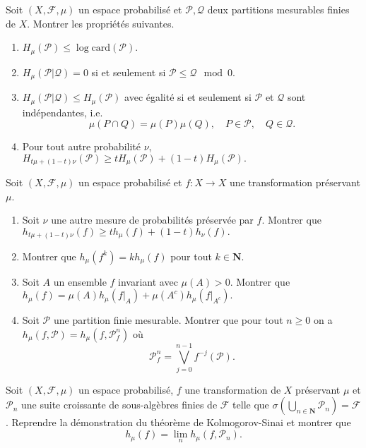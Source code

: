 \documentclass[a4paper,10pt,openany]{article}
\theoremstyle{plain}
\theoremstyle{definition}
\newcommand{\N}{\mathbf{N}}
\newcommand{\Pcal}{\mathcal{P}}
\begin{document}
\noindent Soit $(X,\mathcal{F},\mu)$ un espace probabilis\'e et $\mathcal{P}, \mathcal{Q}$ deux partitions mesurables finies de $X$. Montrer les propri\'et\'es suivantes.
\begin{enumerate}
\item $H_\mu(\mathcal{P}) \leq \log \mathrm{card} (\mathcal{P})$.
\item $H_\mu(\mathcal{P}| \mathcal{Q}) = 0$ si et seulement si $\mathcal{P}\leq \mathcal{Q} \mod 0$.
\item $H_\mu(\mathcal{P}| \mathcal{Q}) \leq H_\mu(\mathcal{P})$ avec \'egalit\'e si et seulement si $\mathcal{P}$ et $\mathcal{Q}$ sont ind\'ependantes, i.e.
$$
\mu(P\cap Q) = \mu(P)\mu(Q), \quad P \in \mathcal{P}, \quad Q \in \mathcal{Q}.
$$
\item Pour tout autre probabilit\'e $\nu$, $H_{t\mu+(1-t)\nu}(\mathcal{P}) \geq t H_\mu(\mathcal{P}) + (1-t)H_\mu(\mathcal{P}).$
\end{enumerate}
\vspace{0.6cm}

 \vspace{1.5mm} 

\noindent Soit $(X,\mathcal{F},\mu)$ un espace probabilis\'e et $f: X \to X$ une transformation pr\'eservant $\mu$.
\begin{enumerate}
\item Soit $\nu$ une autre mesure de probabilit\'es pr\'eserv\'ee par $f$. Montrer que
$
h_{t\mu + (1-t)\nu}(f) \geq th_{\mu}(f) + (1-t)h_\nu(f). 
$
\item Montrer que $h_\mu(f^k) = kh_\mu(f)$ pour tout $k \in \N$.
\item Soit $A$ un ensemble $f$ invariant avec $\mu(A) > 0$. Montrer que 
$h_\mu(f) = \mu(A) h_\mu(f|_A) + \mu(A^c) h_\mu(f|_{A^c}).$
\item Soit $\Pcal$ une partition finie mesurable. Montrer que pour tout $n \geqslant 0$ on a $h_\mu(f, \Pcal) = h_\mu(f, \Pcal^n_f)$ o\`u
$$
\Pcal^n_f = \bigvee_{j=0}^{n-1} f^{-j}(\Pcal).
$$
\end{enumerate}

\vspace{0.6cm}

 \vspace{1.5mm} 

\noindent Soit $(X, \mathcal{F}, \mu)$ un espace probabilis\'e, $f$ une transformation de $X$ pr\'eservant $\mu$ et $\mathcal{P}_n$ une suite croissante de sous-alg\`ebres finies de $\mathcal{F}$ telle que $\sigma\left(\bigcup_{n \in \N} \mathcal{P}_n\right) = \mathcal{F}$. Reprendre la d\'emonstration du th\'eor\`eme de Kolmogorov-Sinai et montrer que 
$$
h_\mu(f) = \lim_n h_\mu(f, \Pcal_n).
$$
\end{document}

